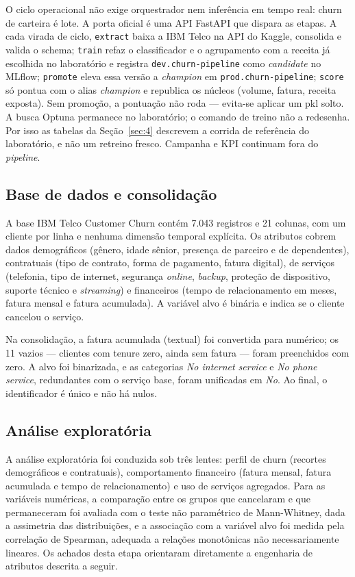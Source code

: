 \documentclass[12pt]{article}
\begin{document}
O ciclo operacional não exige orquestrador nem inferência em tempo real:
churn de carteira é lote. A porta oficial é uma API FastAPI que dispara as
etapas. A cada virada de ciclo, \texttt{extract} baixa a IBM Telco na API
do Kaggle, consolida e valida o schema; \texttt{train} refaz o classificador
e o agrupamento com a receita já escolhida no laboratório e registra
\texttt{dev.churn-pipeline} como \textit{candidate} no MLflow;
\texttt{promote} eleva essa versão a \textit{champion} em
\texttt{prod.churn-pipeline}; \texttt{score} só pontua com o alias
\textit{champion} e republica os núcleos (volume, fatura, receita exposta).
Sem promoção, a pontuação não roda --- evita-se aplicar um pkl solto. A
busca Optuna permanece no laboratório; o comando de treino não a redesenha.
Por isso as tabelas da Seção~\ref{sec:4} descrevem a corrida de referência
do laboratório, e não um retreino fresco. Campanha e KPI continuam fora do
\textit{pipeline}.

\subsection{Base de dados e consolidação}
\label{sub:base}

A base IBM Telco Customer Churn \cite{ibm2018} contém 7.043 registros e 21
colunas, com um cliente por linha e nenhuma dimensão temporal explícita. Os
atributos cobrem dados demográficos (gênero, idade sênior, presença de parceiro
e de dependentes), contratuais (tipo de contrato, forma de pagamento, fatura
digital), de serviços (telefonia, tipo de internet, segurança
\textit{online}, \textit{backup}, proteção de dispositivo, suporte técnico e
\textit{streaming}) e financeiros (tempo de relacionamento em meses, fatura
mensal e fatura acumulada). A variável alvo é binária e indica se o cliente
cancelou o serviço.

Na consolidação, a fatura acumulada (textual) foi convertida para numérico; os
11 vazios --- clientes com tenure zero, ainda sem fatura --- foram
preenchidos com zero. A alvo foi binarizada, e as categorias \textit{No
internet service} e \textit{No phone service}, redundantes com o serviço
base, foram unificadas em \textit{No}. Ao final, o identificador é único e
não há nulos.

\subsection{Análise exploratória}

A análise exploratória foi conduzida sob três lentes: perfil de churn (recortes
demográficos e contratuais), comportamento financeiro (fatura mensal, fatura
acumulada e tempo de relacionamento) e uso de serviços agregados. Para as
variáveis numéricas, a comparação entre os grupos que cancelaram e que
permaneceram foi avaliada com o teste não paramétrico de Mann-Whitney, dada a
assimetria das distribuições, e a associação com a variável alvo foi medida pela
correlação de Spearman, adequada a relações monotônicas não necessariamente
lineares. Os achados desta etapa orientaram diretamente a engenharia de
atributos descrita a seguir.
\end{document}
